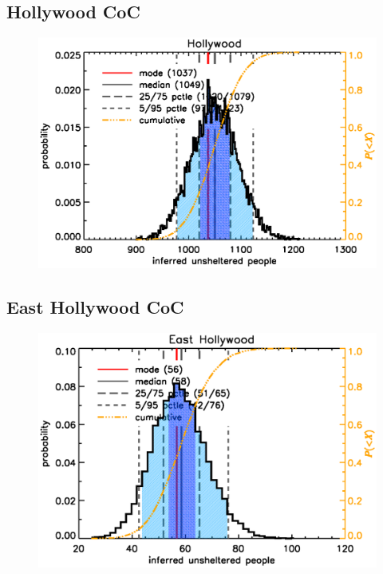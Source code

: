 \documentclass[11pt,twocolumn]{article}
\begin{document}
\subsection{Hollywood CoC}
\label{sec:hWood}

\begin{figure}[h]
	\centering
	\includegraphics[width =\linewidth]{hWood/HollywoodDist}
	\caption{}
\end{figure}

\subsection{East Hollywood CoC}
\label{sec:eHo}

\begin{figure}[h]
	\centering
	\includegraphics[width =\linewidth]{eHo/EastHollywoodDist}
	\caption{}
\end{figure}
\end{document}
